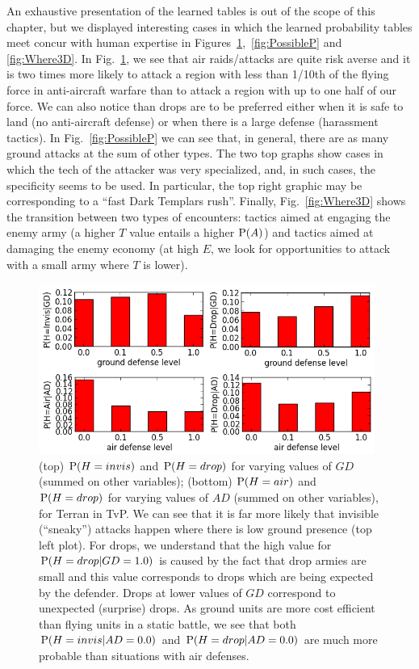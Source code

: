 An exhaustive presentation of the learned tables is out of the scope of this chapter, but we displayed interesting cases in which the learned probability tables meet concur with human expertise in Figures~\ref{fig:P_H_AD},~\ref{fig:PossibleP} and \ref{fig:Where3D}. In Fig.~\ref{fig:P_H_AD}, we see that air raids/attacks are quite risk averse and it is two times more likely to attack a region with less than 1/10th of the flying force in anti-aircraft warfare than to attack a region with up to one half of our force. We can also notice than drops are to be preferred either when it is safe to land (no anti-aircraft defense) or when there is a large defense (harassment tactics). In Fig.~\ref{fig:PossibleP} we can see that, in general, there are as many ground attacks at the sum of other types. The two top graphs show cases in which the tech of the attacker was very specialized, and, in such cases, the specificity seems to be used. In particular, the top right graphic may be corresponding to a ``fast Dark Templars rush''. Finally, Fig.~\ref{fig:Where3D} shows the transition between two types of encounters: tactics aimed at engaging the enemy army (a higher $T$ value entails a higher $\mathrm{P}(A)$) and tactics aimed at damaging the enemy economy (at high $E$, we look for opportunities to attack with a small army where $T$ is lower).

\begin{figure}[!h]
\centerline{\includegraphics[width=11cm]{images/Terran_Prob_H_crop.png}}
\caption{(top) $\mathrm{P}(H=invis)$ and $\mathrm{P}(H=drop)$ for varying values of $GD$ (summed on other variables); (bottom) $\mathrm{P}(H=air)$ and $\mathrm{P}(H=drop)$ for varying values of $AD$ (summed on other variables), for Terran in TvP. We can see that it is far more likely that invisible (``sneaky'') attacks happen where there is low ground presence (top left plot). For drops, we understand that the high value for $\mathrm{P}(H=drop|GD=1.0)$ is caused by the fact that drop armies are small and this value corresponds to drops which are being expected by the defender. Drops at lower values of $GD$ correspond to unexpected (surprise) drops. As ground units are more cost efficient than flying units in a static battle, we see that both $\mathrm{P}(H=invis|AD=0.0)$ and $\mathrm{P}(H=drop|AD=0.0)$ are much more probable than situations with air defenses.}
\label{fig:P_H_AD}
\end{figure}

